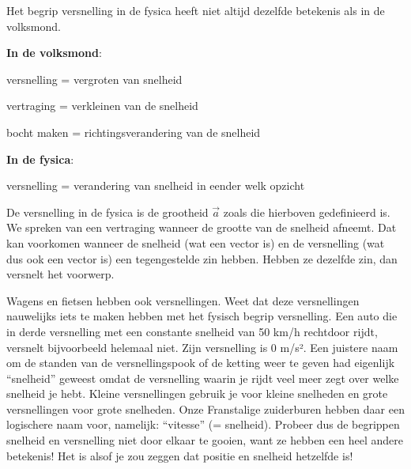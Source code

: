 \documentclass{ximera}
\begin{document}
\begin{remark}
	Het begrip versnelling in de fysica heeft niet altijd dezelfde betekenis als in de volksmond.

	\textbf{In de volksmond}:
	\begin{description}
		\item versnelling = vergroten van snelheid
		\item vertraging = verkleinen van de snelheid
		\item bocht maken = richtingsverandering van de snelheid
	\end{description}
	\textbf{In de fysica}:
	\begin{description}
		\item  versnelling = verandering van snelheid in eender welk opzicht
	\end{description}
	De versnelling in de fysica is de grootheid $\vec{a}$ zoals die hierboven gedefinieerd is. We spreken van een vertraging wanneer de grootte van de snelheid afneemt. Dat kan voorkomen wanneer de snelheid (wat een vector is) en de versnelling (wat dus ook een vector is) een tegengestelde zin hebben. Hebben ze dezelfde zin, dan versnelt het voorwerp.



\end{remark}

\begin{remark}

Wagens en fietsen hebben ook versnellingen. 
Weet dat deze versnellingen nauwelijks iets te maken hebben met het fysisch begrip versnelling. 
Een auto die in derde versnelling met een constante snelheid van 50 km/h rechtdoor rijdt, versnelt bijvoorbeeld helemaal niet. 
Zijn versnelling is 0 m/s². 
Een juistere naam om de standen van de versnellingspook of de ketting weer te geven had eigenlijk “snelheid” geweest omdat de versnelling waarin je rijdt veel meer zegt over welke snelheid je hebt. 
Kleine versnellingen gebruik je voor kleine snelheden en grote versnellingen voor grote snelheden. 
Onze Franstalige zuiderburen hebben daar een logischere naam voor, namelijk: “vitesse” (= snelheid). 
Probeer dus de begrippen snelheid en versnelling niet door elkaar te gooien, want ze hebben een heel andere betekenis! 
Het is alsof je zou zeggen dat positie en snelheid hetzelfde is!


\end{remark}
\end{document}
